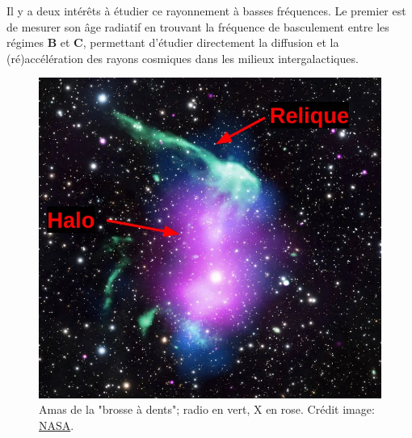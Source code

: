 \pg
Il y a deux int\'er\^ets \`a \'etudier ce rayonnement \`a basses fr\'equences. Le premier est de mesurer son \^age radiatif en trouvant la fr\'equence de basculement entre les r\'egimes \textbf{B} et \textbf{C}, permettant d'\'etudier directement la diffusion et la (r\'e)acc\'el\'eration des rayons cosmiques dans les milieux intergalactiques.

\begin{figure}\centering
	\vspace{-2.5\baselineskip}
	\includegraphics[width=\linewidth]{ProjetRecherche/toothbrush_edited.jpeg}
	\caption{Amas de la "brosse \`a dents"; radio en vert, X en rose. Cr\'edit image: \href{https://www.nasa.gov/wp-content/uploads/2023/03/toothbrush.jpg}{NASA}.\vspace{-0.8\baselineskip}} \label{fig.relics}
	\vspace{-.4\baselineskip}
\end{figure}


